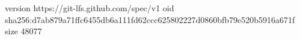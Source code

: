 version https://git-lfs.github.com/spec/v1
oid sha256:d7ab879a71ffc6455db6a111fd62ccc625802227d0860bfb79e520b5916a671f
size 48077
